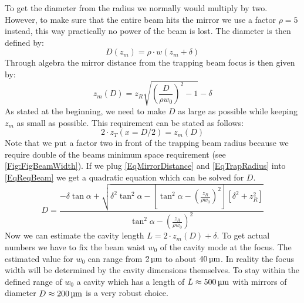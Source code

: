 To get the diameter from the radius we normally would multiply by two. However, to make sure that the entire beam hits the mirror we use a factor $\rho = 5$ instead, this way practically no power of the beam is lost. The diameter is then defined by:
\begin{equation}\label{BeamDiameter}
	D(z_{\si{m}})=\rho\cdot w(z_{\si{m}}+\delta)
\end{equation}
Through algebra the mirror distance from the trapping beam focus is then given by:
\begin{equation}\label{EqMirrorDistance}
	z_{\si{m}}(D)=z_{\si{R}}\sqrt{\left(\frac{D}{\rho w_0}\right)^2-1}-\delta
\end{equation}
As stated at the beginning, we need to make $D$ as large as possible while keeping $z_{\si{m}}$ as small as possible. This requirement can be stated as follows:
\begin{equation}\label{EqReqBeam}
	2\cdot z_{\si{T}}(x=D/2)=z_{\si{m}}(D)
\end{equation}
Note that we put a factor two in front of the trapping beam radius because we require double of the beams minimum space requirement (see \autoref{Fig:FigBeamWidth}). If we plug \autoref{EqMirrorDistance} and \autoref{EqTrapRadius} into \autoref{EqReqBeam} we get a quadratic equation which can be solved for $D$.
\begin{equation}
	D=\frac{-\delta\tan\alpha+\sqrt{\delta^2\tan^2\alpha -\left[\tan^2\alpha-\left(\frac{z_{\si{R}}}{\rho w_0}\right)^2\right]\left[\delta^2+z_{\si{R}}^2\right]}}{\tan^2\alpha-\left(\frac{z_{\si{R}}}{\rho w_0}\right)^2}
\end{equation}
Now we can estimate the cavity length $L=2\cdot z_{\si{m}}(D)+\delta$. To get actual numbers we have to fix the beam waist $w_0$ of the cavity mode at the focus. The estimated value for $w_0$ can range from $2\um$ to about $40\um$. In reality the focus width will be determined by the cavity dimensions themselves. To stay within the defined range of $w_0$ a cavity which has a length of $L\approx 500\um$ with mirrors of diameter $D\approx 200\um$ is a very robust choice.

